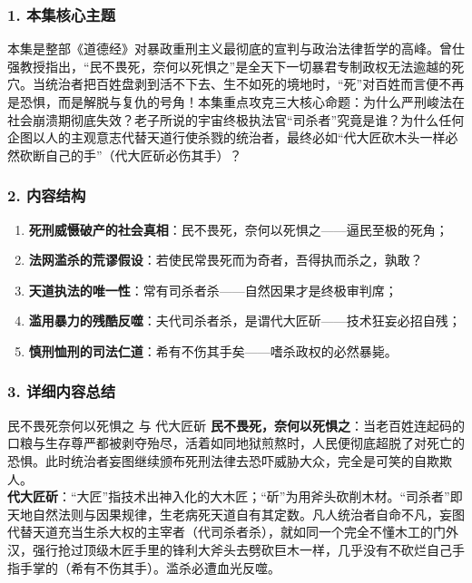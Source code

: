 \subsubsection{1. 本集核心主题}
本集是整部《道德经》对暴政重刑主义最彻底的宣判与政治法律哲学的高峰。曾仕强教授指出，“民不畏死，奈何以死惧之”是全天下一切暴君专制政权无法逾越的死穴。当统治者把百姓盘剥到活不下去、生不如死的境地时，“死”对百姓而言便不再是恐惧，而是解脱与复仇的号角！本集重点攻克三大核心命题：为什么严刑峻法在社会崩溃期彻底失效？老子所说的宇宙终极执法官“司杀者”究竟是谁？为什么任何企图以人的主观意志代替天道行使杀戮的统治者，最终必如“代大匠砍木头一样必然砍断自己的手”（代大匠斫必伤其手）？

\subsubsection{2. 内容结构}
\begin{enumerate}
    \item \textbf{死刑威慑破产的社会真相}：民不畏死，奈何以死惧之——逼民至极的死角；
    \item \textbf{法网滥杀的荒谬假设}：若使民常畏死而为奇者，吾得执而杀之，孰敢？
    \item \textbf{天道执法的唯一性}：常有司杀者杀——自然因果才是终极审判席；
    \item \textbf{滥用暴力的残酷反噬}：夫代司杀者杀，是谓代大匠斫——技术狂妄必招自残；
    \item \textbf{慎刑恤刑的司法仁道}：希有不伤其手矣——嗜杀政权的必然暴毙。
\end{enumerate}

\subsubsection{3. 详细内容总结}

\begin{ConceptBox}{民不畏死奈何以死惧之 与 代大匠斫}
\textbf{民不畏死，奈何以死惧之}：当老百姓连起码的口粮与生存尊严都被剥夺殆尽，活着如同地狱煎熬时，人民便彻底超脱了对死亡的恐惧。此时统治者妄图继续颁布死刑法律去恐吓威胁大众，完全是可笑的自欺欺人。\\
\textbf{代大匠斫}：“大匠”指技术出神入化的大木匠；“斫”为用斧头砍削木材。“司杀者”即天地自然法则与因果规律，生老病死天道自有其定数。凡人统治者自命不凡，妄图代替天道充当生杀大权的主宰者（代司杀者杀），就如同一个完全不懂木工的门外汉，强行抢过顶级木匠手里的锋利大斧头去劈砍巨木一样，几乎没有不砍烂自己手指手掌的（希有不伤其手）。滥杀必遭血光反噬。
\end{ConceptBox}

